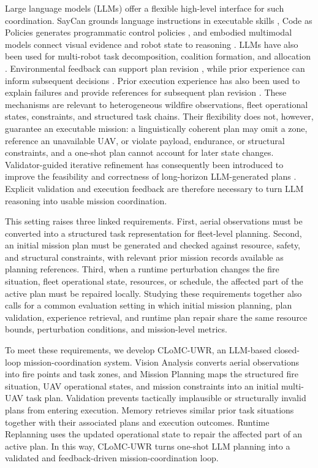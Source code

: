 Large language models (LLMs) offer a flexible high-level interface for such
coordination. SayCan grounds language instructions in executable skills
\cite{ahn2022saycan}, Code as Policies generates programmatic control policies
\cite{liang2023codeaspolicies}, and embodied multimodal models connect visual
evidence and robot state to reasoning \cite{driess2023palme,zeng2023socratic}.
LLMs have also been used for multi-robot task decomposition, coalition
formation, and allocation \cite{kannan2024smartllm}. Environmental feedback can
support plan revision \cite{huang2023innermonologue}, while prior experience
can inform subsequent decisions \cite{wang2023voyager}.
Prior execution experience has also been used to explain failures and provide
references for subsequent plan revision \cite{liu2023reflect}. These
mechanisms are relevant to heterogeneous wildfire observations, fleet
operational states,
constraints, and structured task chains. Their flexibility does not, however,
guarantee an executable mission: a linguistically coherent plan may omit a
zone, reference an unavailable UAV, or violate payload, endurance, or structural
constraints, and a one-shot plan cannot account for later state changes.
Validator-guided iterative refinement has consequently been introduced to
improve the feasibility and correctness of long-horizon LLM-generated plans
\cite{zhou2024isrllm}. Explicit validation and execution feedback are therefore
necessary to turn LLM reasoning into usable mission coordination.

This setting raises three linked requirements. First, aerial observations must
be converted into a structured task representation for fleet-level planning.
Second, an initial mission plan must be generated and checked against resource, safety,
and structural constraints, with relevant prior mission records available as
planning references. Third, when a runtime perturbation changes the fire
situation, fleet operational state, resources, or schedule, the affected part
of the active plan must be
repaired locally. Studying these requirements together also calls for a common
evaluation setting in which initial mission planning, plan validation,
experience retrieval, and runtime plan repair share the same resource bounds, perturbation
conditions, and mission-level metrics.

To meet these requirements, we develop CLoMC-UWR, an LLM-based closed-loop
mission-coordination system. Vision Analysis converts aerial observations into
fire points and task zones, and Mission Planning maps the structured fire
situation, UAV operational states, and mission constraints into an initial
multi-UAV task plan.
Validation prevents tactically implausible or structurally invalid plans from
entering execution. Memory retrieves similar prior task situations together
with their associated plans and execution outcomes. Runtime Replanning uses the
updated operational state to repair the affected part of an active plan. In
this way, CLoMC-UWR turns one-shot LLM planning into a validated and
feedback-driven mission-coordination loop.

